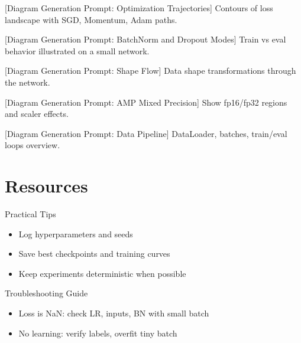 \documentclass[aspectratio=169,10pt]{beamer}
\begin{document}
\begin{frame}{[Diagram Generation Prompt: Optimization Trajectories]}
Contours of loss landscape with SGD, Momentum, Adam paths.
\end{frame}

\begin{frame}{[Diagram Generation Prompt: BatchNorm and Dropout Modes]}
Train vs eval behavior illustrated on a small network.
\end{frame}

\begin{frame}{[Diagram Generation Prompt: Shape Flow]} 
Data shape transformations through the network.
\end{frame}

\begin{frame}{[Diagram Generation Prompt: AMP Mixed Precision]} 
Show fp16/fp32 regions and scaler effects.
\end{frame}

\begin{frame}{[Diagram Generation Prompt: Data Pipeline]} 
DataLoader, batches, train/eval loops overview.
\end{frame}

\section{Resources}

\begin{frame}{Practical Tips}
\begin{itemize}
    \item Log hyperparameters and seeds
    \item Save best checkpoints and training curves
    \item Keep experiments deterministic when possible
\end{itemize}
\end{frame}

\begin{frame}{Troubleshooting Guide}
\begin{itemize}
    \item Loss is NaN: check LR, inputs, BN with small batch
    \item No learning: verify labels, overfit tiny batch
\end{itemize}
\end{frame}
\end{document}
